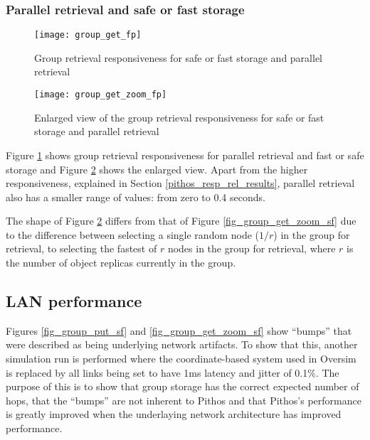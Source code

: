 \subsubsection{Parallel retrieval and safe or fast storage}
\begin{figure}[htbp]
 \centering
 \texttt{[image: group\_get\_fp]}
 \caption{Group retrieval responsiveness for safe or fast storage and parallel retrieval}
 \label{fig_group_get_fp}
\end{figure}

\begin{figure}[htbp]
 \centering
 \texttt{[image: group\_get\_zoom\_fp]}
 \caption{Enlarged view of the group retrieval responsiveness for safe or fast storage and parallel retrieval}
 \label{fig_group_get_zoom_fp}
\end{figure}
%
Figure \ref{fig_group_get_fp} shows group retrieval responsiveness for parallel retrieval and fast or safe storage and Figure \ref{fig_group_get_zoom_fp} shows the enlarged view. Apart from the higher responsiveness, explained in Section \ref{pithos_resp_rel_results}, parallel retrieval also has a smaller range of values: from zero to 0.4 seconds.

The shape of Figure \ref{fig_group_get_zoom_fp} differs from that of Figure \ref{fig_group_get_zoom_sf} due to the difference between selecting a single random node ($1/r$) in the group for retrieval, to selecting the fastest of $r$ nodes in the group for retrieval, where $r$ is the number of object replicas currently in the group.

\subsection{LAN performance}
\label{lan_retrieval}

Figures \ref{fig_group_put_sf} and \ref{fig_group_get_zoom_sf} show ``bumps'' that were described as being underlying network artifacts. To show that this, another simulation run is performed where the coordinate-based system used in Oversim is replaced by all links being set to have 1ms latency and jitter of 0.1\%. The purpose of this is to show that group storage has the correct expected number of hops, that the ``bumps'' are not inherent to Pithos and that Pithos's performance is greatly improved when the underlaying network architecture has improved performance.

